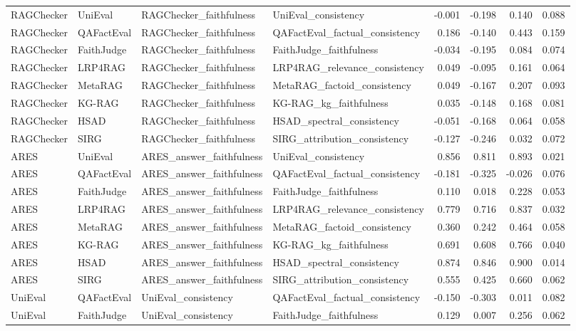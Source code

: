 \begin{table}
\begin{tabular}{llllrrrr}
RAGChecker & UniEval & RAGChecker_faithfulness & UniEval_consistency & -0.001 & -0.198 & 0.140 & 0.088 \\
RAGChecker & QAFactEval & RAGChecker_faithfulness & QAFactEval_factual_consistency & 0.186 & -0.140 & 0.443 & 0.159 \\
RAGChecker & FaithJudge & RAGChecker_faithfulness & FaithJudge_faithfulness & -0.034 & -0.195 & 0.084 & 0.074 \\
RAGChecker & LRP4RAG & RAGChecker_faithfulness & LRP4RAG_relevance_consistency & 0.049 & -0.095 & 0.161 & 0.064 \\
RAGChecker & MetaRAG & RAGChecker_faithfulness & MetaRAG_factoid_consistency & 0.049 & -0.167 & 0.207 & 0.093 \\
RAGChecker & KG-RAG & RAGChecker_faithfulness & KG-RAG_kg_faithfulness & 0.035 & -0.148 & 0.168 & 0.081 \\
RAGChecker & HSAD & RAGChecker_faithfulness & HSAD_spectral_consistency & -0.051 & -0.168 & 0.064 & 0.058 \\
RAGChecker & SIRG & RAGChecker_faithfulness & SIRG_attribution_consistency & -0.127 & -0.246 & 0.032 & 0.072 \\
ARES & UniEval & ARES_answer_faithfulness & UniEval_consistency & 0.856 & 0.811 & 0.893 & 0.021 \\
ARES & QAFactEval & ARES_answer_faithfulness & QAFactEval_factual_consistency & -0.181 & -0.325 & -0.026 & 0.076 \\
ARES & FaithJudge & ARES_answer_faithfulness & FaithJudge_faithfulness & 0.110 & 0.018 & 0.228 & 0.053 \\
ARES & LRP4RAG & ARES_answer_faithfulness & LRP4RAG_relevance_consistency & 0.779 & 0.716 & 0.837 & 0.032 \\
ARES & MetaRAG & ARES_answer_faithfulness & MetaRAG_factoid_consistency & 0.360 & 0.242 & 0.464 & 0.058 \\
ARES & KG-RAG & ARES_answer_faithfulness & KG-RAG_kg_faithfulness & 0.691 & 0.608 & 0.766 & 0.040 \\
ARES & HSAD & ARES_answer_faithfulness & HSAD_spectral_consistency & 0.874 & 0.846 & 0.900 & 0.014 \\
ARES & SIRG & ARES_answer_faithfulness & SIRG_attribution_consistency & 0.555 & 0.425 & 0.660 & 0.062 \\
UniEval & QAFactEval & UniEval_consistency & QAFactEval_factual_consistency & -0.150 & -0.303 & 0.011 & 0.082 \\
UniEval & FaithJudge & UniEval_consistency & FaithJudge_faithfulness & 0.129 & 0.007 & 0.256 & 0.062 \\

\end{tabular}
\end{table}
